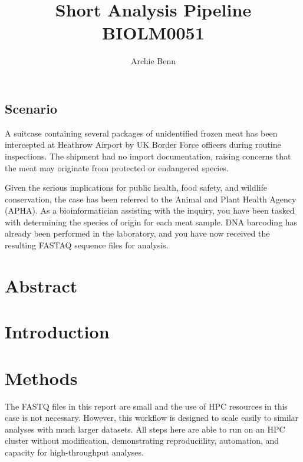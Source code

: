 \documentclass[12pt]{article}
\title{\LARGE\textbf{Short Analysis Pipeline}\\\vspace{1mm}\large BIOLM0051}
\author{Archie Benn}
\date{}
\begin{document}
\maketitle

\subsection*{Scenario}
A suitcase containing several packages of unidentified frozen meat has been intercepted at Heathrow Airport by UK Border Force officers during routine inspections. The shipment had no import documentation, raising concerns that the meat may originate from protected or endangered species.\newline

Given the serious implications for public health, food safety, and wildlife conservation, the case has been referred to the Animal and Plant Health Agency (APHA). As a bioinformatician assisting with the inquiry, you have been tasked with determining the species of origin for each meat sample. DNA barcoding has already been performed in the laboratory, and you have now received the resulting FASTAQ sequence files for analysis.



\section*{Abstract} %




\section*{Introduction}




\section*{Methods}
The FASTQ files in this report are small and the use of HPC resources in this case is not necessary. However, this workflow is designed to scale easily to similar analyses with much larger datasets. All steps here are able to run on an HPC cluster without modification, demonstrating reproduciility, automation, and capacity for high-throughput analyses.
\end{document}
